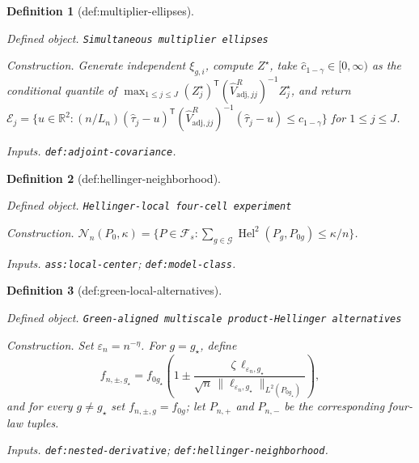 \documentclass{article}
\newtheorem{definition}{Definition}
\begin{document}
\begin{definition}[def:multiplier-ellipses]\label{def:multiplier-ellipses}
\par\smallskip\noindent\emph{Defined object.} \texttt{Simultaneous multiplier ellipses}
\par\smallskip\noindent\emph{Construction.} Generate independent \(\xi_{g,i}\), compute \(Z^\star\), take \(\widehat c_{1-\gamma}\in[0,\infty)\) as the conditional quantile of \(\max_{1\le j\le J}(Z_j^\star)^{\mathsf T}(\widehat V_{\mathrm{adj},jj}^{R})^{-1}Z_j^\star\), and return \(\mathcal E_j=\{u\in\mathbb R^2:(n/L_n)(\widehat\tau_j-u)^{\mathsf T}(\widehat V_{\mathrm{adj},jj}^{R})^{-1}(\widehat\tau_j-u)\le\widehat c_{1-\gamma}\}\) for \(1\leq j\leq J\).
\par\smallskip\noindent\emph{Inputs.} \texttt{def:\allowbreak{}adjoint-\allowbreak{}covariance}.
\end{definition}

\begin{definition}[def:hellinger-neighborhood]\label{def:hellinger-neighborhood}
\par\smallskip\noindent\emph{Defined object.} \texttt{Hellinger-\allowbreak{}local four-\allowbreak{}cell experiment}
\par\smallskip\noindent\emph{Construction.} \(\mathcal N_n(P_0,\kappa)=\{P\in\mathcal F_s:\sum_{g\in\mathcal G}\operatorname{Hel}^2(P_g,P_{0g})\leq\kappa/n\}\).
\par\smallskip\noindent\emph{Inputs.} \texttt{ass:\allowbreak{}local-\allowbreak{}center}; \texttt{def:\allowbreak{}model-\allowbreak{}class}.
\end{definition}

\begin{definition}[def:green-local-alternatives]\label{def:green-local-alternatives}
\par\smallskip\noindent\emph{Defined object.} \texttt{Green-\allowbreak{}aligned multiscale product-\allowbreak{}Hellinger alternatives}
\par\smallskip\noindent\emph{Construction.} Set \(\varepsilon_n=n^{-\eta}\). For \(g=g_\star\), define \[f_{n,\pm,g_\star}=f_{0g_\star}\left(1\pm\frac{\zeta\,\ell_{\varepsilon_n,g_\star}}{\sqrt n\,\lVert\ell_{\varepsilon_n,g_\star}\rVert_{L^2(P_{0g_\star})}}\right),\] and for every \(g\neq g_\star\) set \(f_{n,\pm,g}=f_{0g}\); let \(P_{n,+}\) and \(P_{n,-}\) be the corresponding four-law tuples.
\par\smallskip\noindent\emph{Inputs.} \texttt{def:\allowbreak{}nested-\allowbreak{}derivative}; \texttt{def:\allowbreak{}hellinger-\allowbreak{}neighborhood}.
\end{definition}
\end{document}
